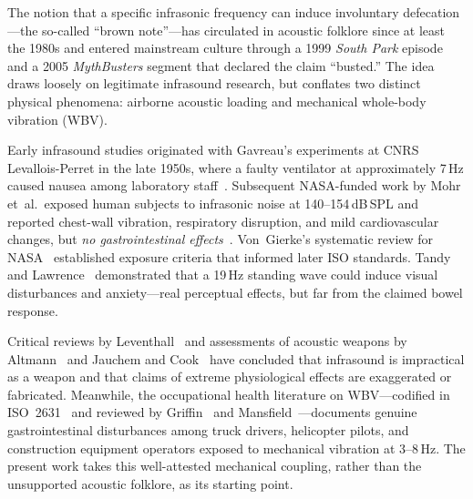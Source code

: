 
The notion that a specific infrasonic frequency can induce involuntary
defecation---the so-called ``brown note''---has circulated in acoustic folklore
since at least the 1980s and entered mainstream culture through a 1999
\emph{South Park} episode and a 2005 \emph{MythBusters} segment that declared
the claim ``busted.''  The idea draws loosely on legitimate infrasound research,
but conflates two distinct physical phenomena: airborne acoustic loading and
mechanical whole-body vibration (WBV).

Early infrasound studies originated with Gavreau's experiments at CNRS
Levallois-Perret in the late 1950s, where a faulty ventilator at approximately
7\,Hz caused nausea among laboratory staff~\cite{Gavreau1966,Leventhall2007}.  Subsequent
NASA-funded work by Mohr et~al.\ exposed human subjects to infrasonic noise at
140--154\,dB\,SPL and reported chest-wall vibration, respiratory disruption, and
mild cardiovascular changes, but \emph{no gastrointestinal
effects}~\cite{Mohr1965}.  Von~Gierke's systematic review for
NASA~\cite{vonGierke1974} established exposure criteria that informed later ISO
standards.  Tandy and Lawrence~\cite{Tandy1998} demonstrated that a 19\,Hz
standing wave could induce visual disturbances and anxiety---real perceptual
effects, but far from the claimed bowel response.

Critical reviews by Leventhall~\cite{Leventhall2003,Leventhall2007} and
assessments of acoustic weapons by Altmann~\cite{Altmann1999} and Jauchem and
Cook~\cite{Jauchem2007} have concluded that infrasound is impractical as a
weapon and that claims of extreme physiological effects are exaggerated or
fabricated.  Meanwhile, the occupational health literature on WBV---codified in
ISO~2631~\cite{iso2631} and reviewed by Griffin~\cite{griffin1990handbook} and
Mansfield~\cite{mansfield2005human}---documents genuine gastrointestinal
disturbances among truck drivers, helicopter pilots, and construction equipment
operators exposed to mechanical vibration at 3--8\,Hz.  The present work takes
this well-attested mechanical coupling, rather than the unsupported acoustic
folklore, as its starting point.
